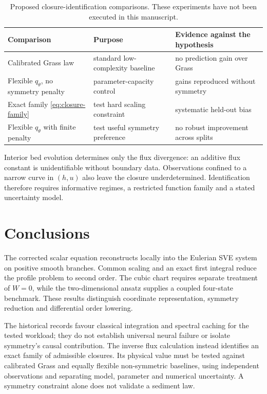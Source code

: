 \documentclass[11pt,a4paper,oneside]{report}
\numberwithin{equation}{chapter}
\begin{document}
\begin{table}[!htbp]\centering\small
\begin{tabularx}{\textwidth}{@{}>{\raggedright\arraybackslash}p{}XX@{}}\toprule
Comparison & Purpose & Evidence against the hypothesis\\\midrule
Calibrated Grass law & standard low-complexity baseline & no prediction gain over Grass\\
Flexible $q_\theta$, no symmetry penalty & parameter-capacity control & gains reproduced without symmetry\\
Exact family \eqref{eq:closure-family} & test hard scaling constraint & systematic held-out bias\\
Flexible $q_\theta$ with finite penalty & test useful symmetry preference & no robust improvement across splits\\\bottomrule
\end{tabularx}
\caption{Proposed closure-identification comparisons. These experiments have not been executed in this manuscript.}\label{tab:identification}
\end{table}
Interior bed evolution determines only the flux divergence: an additive flux constant is unidentifiable without boundary data. Observations confined to a narrow curve in $(h,u)$ also leave the closure underdetermined. Identification therefore requires informative regimes, a restricted function family and a stated uncertainty model.

\section{Conclusions}
The corrected scalar equation reconstructs locally into the Eulerian SVE system on positive smooth branches. Common scaling and an exact first integral reduce the profile problem to second order. The cubic chart requires separate treatment of $W=0$, while the two-dimensional ansatz supplies a coupled four-state benchmark. These results distinguish coordinate representation, symmetry reduction and differential order lowering.

The historical records favour classical integration and spectral caching for the tested workload; they do not establish universal neural failure or isolate symmetry's causal contribution. The inverse flux calculation instead identifies an exact family of admissible closures. Its physical value must be tested against calibrated Grass and equally flexible non-symmetric baselines, using independent observations and separating model, parameter and numerical uncertainty. A symmetry constraint alone does not validate a sediment law.
\end{document}
